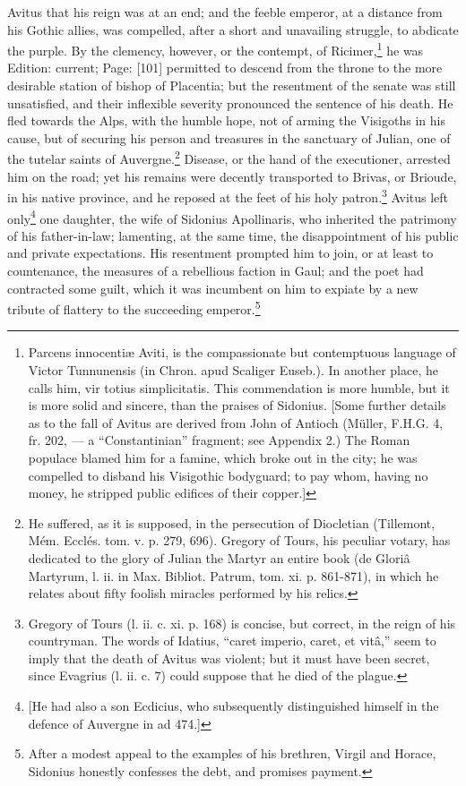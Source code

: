 Avitus that his reign was at an end; and the feeble emperor, at a distance from his Gothic allies, was compelled, after a short and unavailing struggle, to abdicate the purple. By the clemency, however, or the contempt, of Ricimer,\footnote{Parcens innocentiæ Aviti, is the compassionate but contemptuous language of Victor Tunnunensis (in Chron. apud Scaliger Euseb.). In another place, he calls him, vir totius simplicitatis. This commendation is more humble, but it is more solid and sincere, than the praises of Sidonius. [Some further details as to the fall of Avitus are derived from John of Antioch (Müller, F.H.G. 4, fr. 202, \texthebrew{—} a \texthebrew{“}Constantinian\texthebrew{}” fragment; see Appendix 2.) The Roman populace blamed him for a famine, which broke out in the city; he was compelled to disband his Visigothic bodyguard; to pay whom, having no money, he stripped public edifices of their copper.]} he was Edition: current; Page: [101] permitted to descend from the throne to the more desirable station of bishop of Placentia; but the resentment of the senate was still unsatisfied, and their inflexible severity pronounced the sentence of his death. He fled towards the Alps, with the humble hope, not of arming the Visigoths in his cause, but of securing his person and treasures in the sanctuary of Julian, one of the tutelar saints of Auvergne.\footnote{He suffered, as it is supposed, in the persecution of Diocletian (Tillemont, Mém. Ecclés. tom. v. p. 279, 696). Gregory of Tours, his peculiar votary, has dedicated to the glory of Julian the Martyr an entire book (de Gloriâ Martyrum, l. ii. in Max. Bibliot. Patrum, tom. xi. p. 861-871), in which he relates about fifty foolish miracles performed by his relics.} Disease, or the hand of the executioner, arrested him on the road; yet his remains were decently transported to Brivas, or Brioude, in his native province, and he reposed at the feet of his holy patron.\footnote{Gregory of Tours (l. ii. c. xi. p. 168) is concise, but correct, in the reign of his countryman. The words of Idatius, \texthebrew{“}caret imperio, caret, et vitâ,\texthebrew{}” seem to imply that the death of Avitus was violent; but it must have been secret, since Evagrius (l. ii. c. 7) could suppose that he died of the plague.} Avitus left only\footnote{[He had also a son Ecdicius, who subsequently distinguished himself in the defence of Auvergne in ad 474.]} one daughter, the wife of Sidonius Apollinaris, who inherited the patrimony of his father-in-law; lamenting, at the same time, the disappointment of his public and private expectations. His resentment prompted him to join, or at least to countenance, the measures of a rebellious faction in Gaul; and the poet had contracted some guilt, which it was incumbent on him to expiate by a new tribute of flattery to the succeeding emperor.\footnote{After a modest appeal to the examples of his brethren, Virgil and Horace, Sidonius honestly confesses the debt, and promises payment.

}
